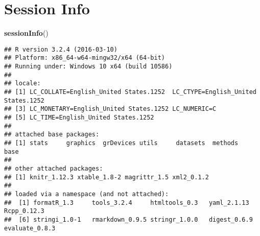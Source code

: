 \documentclass[]{article}
\newenvironment{Shaded}{\begin{snugshade}}{\end{snugshade}}
\newcommand{\KeywordTok}[1]{\textcolor[rgb]{0.13,0.29,0.53}{\textbf{{#1}}}}
\newcommand{\NormalTok}[1]{{#1}}
\begin{document}
\clearpage

\section{Session Info}\label{session-info}

\begin{Shaded}
\begin{Highlighting}[]
\KeywordTok{sessionInfo}\NormalTok{()}
\end{Highlighting}
\end{Shaded}

\begin{verbatim}
## R version 3.2.4 (2016-03-10)
## Platform: x86_64-w64-mingw32/x64 (64-bit)
## Running under: Windows 10 x64 (build 10586)
## 
## locale:
## [1] LC_COLLATE=English_United States.1252  LC_CTYPE=English_United States.1252   
## [3] LC_MONETARY=English_United States.1252 LC_NUMERIC=C                          
## [5] LC_TIME=English_United States.1252    
## 
## attached base packages:
## [1] stats     graphics  grDevices utils     datasets  methods   base     
## 
## other attached packages:
## [1] knitr_1.12.3 xtable_1.8-2 magrittr_1.5 xml2_0.1.2  
## 
## loaded via a namespace (and not attached):
##  [1] formatR_1.3     tools_3.2.4     htmltools_0.3   yaml_2.1.13     Rcpp_0.12.3    
##  [6] stringi_1.0-1   rmarkdown_0.9.5 stringr_1.0.0   digest_0.6.9    evaluate_0.8.3
\end{verbatim}
\end{document}
